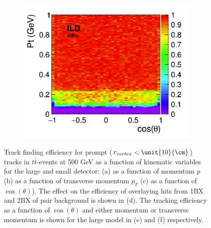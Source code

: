 \begin{figure}[htbp]
\begin{subfigure}{0.49\hsize}
 \caption{ \label{fig:perf:trkeff_2D_p}}
 \end{subfigure}
\begin{subfigure}{0.49\hsize} 
 \includegraphics[width=\hsize]{Performance/fig/newSiliconTracking_10kEvents_effTrk_Pt_v3.png}
 \caption{  \label{fig:perf:trkeff_2D_pt}}
 \end{subfigure}
\caption{
  Track finding efficiency for prompt ($r_{vertex}<\unit{10}{\cm}$) tracks in $t \bar t$-events at 500 GeV as a function of kinematic variables for the large and small detector:
  (a) as a function of momentum $p$  (b) as a function of transverse momentum $p_T$ (c) as a function of $\cos(\theta)$).
  The effect on the efficiency of overlaying hits from 1BX and 2BX of pair background is shown in (d). The tracking efficiency as a
  function of $\cos(\theta)$ and either momentum or transverse momentum is shown for the large model in (e) and (f) respectively. 
}
\label{fig:perf:trkeff}
\end{figure}

